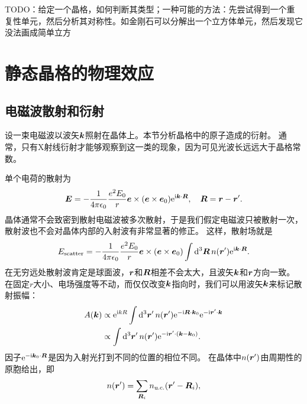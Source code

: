 TODO：给定一个晶格，如何判断其类型；一种可能的方法：先尝试得到一个重复性单元，然后分析其对称性。如金刚石可以分解出一个立方体单元，然后发现它没法画成简单立方


\section{静态晶格的物理效应}

\subsection{电磁波散射和衍射}

设一束电磁波以波矢$\vb*{k}$照射在晶体上。本节分析晶格中的原子造成的衍射。
通常，只有X射线衍射才能够观察到这一类的现象，因为可见光波长远远大于晶格常数。

单个电荷的散射为
\begin{equation}
    \vb*{E} = -\frac{1}{4\pi \epsilon_0} \frac{e^2 E_0}{r} \vb*{e} \times (\vb*{e} \times \vb*{e}_0) \mathrm{e}^{\mathrm{i} \vb*{k} \cdot \vb*{R}}, \quad \vb*{R} = \vb*{r} - \vb*{r}'.
\end{equation}
晶体通常不会致密到散射电磁波被多次散射，于是我们假定电磁波只被散射一次，散射波也不会对晶体内部的入射波有非常显著的修正。
这样，散射场就是
\begin{equation}
    E_\text{scatter} = -\frac{1}{4\pi \epsilon_0} \frac{e^2 E_0}{r} \vb*{e} \times (\vb*{e} \times \vb*{e}_0) \int \dd[3]{\vb*{R}} n(\vb*{r}') \mathrm{e}^{\mathrm{i} \vb*{k} \cdot \vb*{R}}.
\end{equation}
在无穷远处散射波肯定是球面波，$\vb*{r}$和$\vb*{R}$相差不会太大，且波矢$\vb*{k}$和$\vb*{r}$方向一致。
在固定$r$大小、电场强度等不动，而仅仅改变$\vb*{k}$指向时，我们可以用波矢$\vb*{k}$来标记散射振幅：
\begin{equation}
    \begin{aligned}
        A(\vb*{k}) &\propto \mathrm{e}^{\mathrm{i} k R} \int \dd[3]{\vb*{r}'} n(\vb*{r}') \mathrm{e}^{- \mathrm{i} \vb*{R} \cdot \vb*{k}_0} \mathrm{e}^{- \mathrm{i} \vb*{r}' \cdot \vb*{k}} \\
        &\propto \int \dd[3]{\vb*{r}'} n(\vb*{r}') \mathrm{e}^{- \mathrm{i} \vb*{r}' \cdot (\vb*{k} - \vb*{k}_0)}.
    \end{aligned}
    \label{eq:scatter-amplitude-x-ray-original}
\end{equation}
因子$\mathrm{e}^{- \mathrm{i} \vb*{k}_0 \cdot \vb*{R}}$是因为入射光打到不同的位置的相位不同。
在晶体中$n(\vb*{r}')$由周期性的原胞给出，即
\begin{equation}
    n(\vb*{r}') = \sum_{\vb*{R}_i} n_\text{u.c.}(\vb*{r}' - \vb*{R}_i),
\end{equation}
